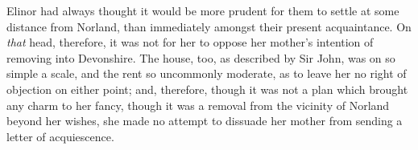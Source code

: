 Elinor had always thought it would be more prudent for them to settle at some distance from Norland, than immediately amongst their present acquaintance. On \textit{that} head, therefore, it was not for her to oppose her mother’s intention of removing into Devonshire. The house, too, as described by Sir John, was on so simple a scale, and the rent so uncommonly moderate, as to leave her no right of objection on either point; and, therefore, though it was not a plan which brought any charm to her fancy, though it was a removal from the vicinity of Norland beyond her wishes, she made no attempt to dissuade her mother from sending a letter of acquiescence.
